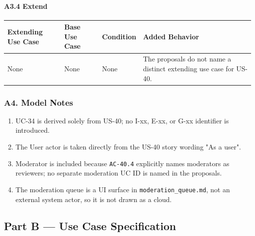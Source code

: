 \documentclass[12pt]{article}
\renewcommand{\baselinestretch}{1.5}
\begin{document}
\hypertarget{sec:a3-4-extend}{}
\paragraph*{A3.4 Extend}
\par\medskip

\begingroup
\small
\renewcommand{\baselinestretch}{1.0}\selectfont
\renewcommand{\arraystretch}{1.15}
\setlength{\tabcolsep}{6pt}
\begin{longtable}{|>{\raggedright\arraybackslash}p{}|>{\raggedright\arraybackslash}p{}|>{\raggedright\arraybackslash}p{}|>{\raggedright\arraybackslash}p{}|}
\hline
\textbf{Extending Use Case} & \textbf{Base Use Case} & \textbf{Condition} & \textbf{Added Behavior} \\ \hline
\endhead
None & None & None & The proposals do not name a distinct extending use case for US-40. \\ \hline
\end{longtable}
\endgroup
\par\medskip

\hypertarget{sec:a4-model-notes}{}
\subsubsection*{A4. Model Notes}
\par\medskip

\begin{enumerate}
\item UC-34 is derived solely from US-40; no I-xx, E-xx, or G-xx identifier is introduced.
\item The User actor is taken directly from the US-40 story wording "As a user".
\item Moderator is included because \texttt{AC-40.4} explicitly names moderators as reviewers; no separate moderation UC ID is named in the proposals.
\item The moderation queue is a UI surface in \texttt{moderation\_queue.md}, not an external system actor, so it is not drawn as a cloud.
\end{enumerate}
\par\medskip

\hypertarget{sec:part-b-use-case-specification}{}
\subsection*{Part B --- Use Case Specification}
\par\medskip
\end{document}
